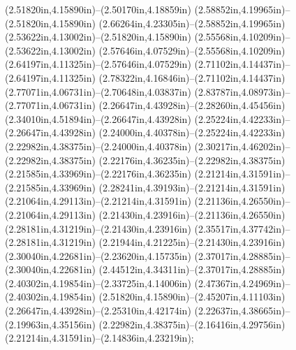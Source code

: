 (2.51820in,4.15890in)--(2.50170in,4.18859in) (2.58852in,4.19965in)--(2.51820in,4.15890in) (2.66264in,4.23305in)--(2.58852in,4.19965in) (2.53622in,4.13002in)--(2.51820in,4.15890in) (2.55568in,4.10209in)--(2.53622in,4.13002in) (2.57646in,4.07529in)--(2.55568in,4.10209in) (2.64197in,4.11325in)--(2.57646in,4.07529in) (2.71102in,4.14437in)--(2.64197in,4.11325in) (2.78322in,4.16846in)--(2.71102in,4.14437in) (2.77071in,4.06731in)--(2.70648in,4.03837in) (2.83787in,4.08973in)--(2.77071in,4.06731in) (2.26647in,4.43928in)--(2.28260in,4.45456in) (2.34010in,4.51894in)--(2.26647in,4.43928in) (2.25224in,4.42233in)--(2.26647in,4.43928in) (2.24000in,4.40378in)--(2.25224in,4.42233in) (2.22982in,4.38375in)--(2.24000in,4.40378in) (2.30217in,4.46202in)--(2.22982in,4.38375in) (2.22176in,4.36235in)--(2.22982in,4.38375in) (2.21585in,4.33969in)--(2.22176in,4.36235in) (2.21214in,4.31591in)--(2.21585in,4.33969in) (2.28241in,4.39193in)--(2.21214in,4.31591in) (2.21064in,4.29113in)--(2.21214in,4.31591in) (2.21136in,4.26550in)--(2.21064in,4.29113in) (2.21430in,4.23916in)--(2.21136in,4.26550in) (2.28181in,4.31219in)--(2.21430in,4.23916in) (2.35517in,4.37742in)--(2.28181in,4.31219in) (2.21944in,4.21225in)--(2.21430in,4.23916in) (2.30040in,4.22681in)--(2.23620in,4.15735in) (2.37017in,4.28885in)--(2.30040in,4.22681in) (2.44512in,4.34311in)--(2.37017in,4.28885in) (2.40302in,4.19854in)--(2.33725in,4.14006in) (2.47367in,4.24969in)--(2.40302in,4.19854in) (2.51820in,4.15890in)--(2.45207in,4.11103in) (2.26647in,4.43928in)--(2.25310in,4.42174in) (2.22637in,4.38665in)--(2.19963in,4.35156in) (2.22982in,4.38375in)--(2.16416in,4.29756in) (2.21214in,4.31591in)--(2.14836in,4.23219in);
